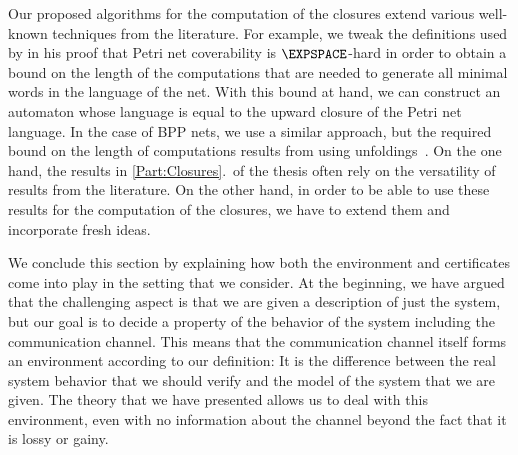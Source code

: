 \documentclass[../../diss.tex]{subfiles}
\begin{document}
Our proposed algorithms for the computation of the closures extend various well-known techniques from the literature.
For example, we tweak the definitions used by  in his proof that Petri net coverability is $\EXPSPACE$-hard in order to obtain a bound on the length of the computations that are needed to generate all minimal words in the language of the net.
With this bound at hand, we can construct an automaton whose language is equal to the upward closure of the Petri net language.
In the case of BPP nets, we use a similar approach, but the required bound on the length of computations results from using unfoldings~\cite{EsparzaH08}.
On the one hand, the results in \cref{Part:Closures}.~of the thesis often rely on the versatility of results from the literature.
On the other hand, in order to be able to use these results for the computation of the closures, we have to extend them and incorporate fresh ideas.

We conclude this section by explaining how both the environment and certificates come into play in the setting that we consider.
At the beginning, we have argued that the challenging aspect is that we are given a description of just the system, but our goal is to decide a property of the behavior of the system including the communication channel.
This means that the communication channel itself forms an environment according to our definition:
It is the difference between the real system behavior that we should verify and the model of the system that we are given.
The theory that we have presented allows us to deal with this environment, even with no information about the channel beyond the fact that it is lossy or gainy.
\end{document}
